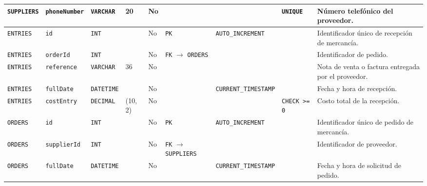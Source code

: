 \documentclass[11pt]{article}
\begin{document}
\begin{landscape}
\begin{xltabular}{\textheight}{
    | p{3.1cm} 
    | p{2.0cm} 
    | p{1.5cm} 
    | p{1.4cm} 
    | p{0.9cm} 
    | p{3.0cm} 
    | p{3.0cm} 
    | p{2.0cm} 
    | p{3.5cm} |
}
    \midrule
    \texttt{SUPPLIERS}          & \texttt{phoneNumber} & \texttt{VARCHAR}   & 20                   & No   &                                                                &                             & \texttt{UNIQUE}        & Número telefónico del proveedor. \\
    \midrule
    \texttt{ENTRIES}            & \texttt{id}          & \texttt{INT}       &                      & No   & \texttt{PK}                                                    & \texttt{AUTO\_INCREMENT}    &               & Identificador único de recepción de mercancía. \\
    \midrule
    \texttt{ENTRIES}            & \texttt{orderId}     & \texttt{INT}       &                      & No   & \texttt{FK} $\longrightarrow$ \texttt{ORDERS}                    &                             &               & Identificador de pedido. \\  
    \midrule
    \texttt{ENTRIES}            & \texttt{reference}   & \texttt{VARCHAR}   & 36                   & No   &                                                                &                             &               & Nota de venta o factura entregada por el proveedor. \\
    \midrule
    \texttt{ENTRIES}            & \texttt{fullDate}    & \texttt{DATETIME}  &                      & No   &                                                                & \texttt{CURRENT\_TIMESTAMP} &               & Fecha y hora de recepción. \\
    \midrule
    \texttt{ENTRIES}            & \texttt{costEntry}   & \texttt{DECIMAL}   & (10, 2)              & No   &                                                                &                             & \texttt{CHECK >= 0}    & Costo total de la recepción. \\
    \midrule
    \texttt{ORDERS}             & \texttt{id}          & \texttt{INT}       &                      & No   & \texttt{PK}                                                    & \texttt{AUTO\_INCREMENT}    &               & Identificador único de pedido de mercancía. \\
    \midrule
    \texttt{ORDERS}             & \texttt{supplierId}  & \texttt{INT}       &                      & No   & \texttt{FK} $\longrightarrow$ \texttt{SUPPLIERS}                 &                             &               & Identificador de proveedor. \\
    \midrule
    \texttt{ORDERS}             & \texttt{fullDate}    & \texttt{DATETIME}  &                      & No   &                                                                & \texttt{CURRENT\_TIMESTAMP} &               & Fecha y hora de solicitud de pedido. \\

\end{xltabular}
\end{landscape}
\end{document}
